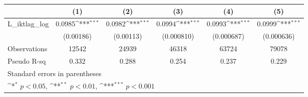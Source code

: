 {
\def\sym#1{\ifmmode^{#1}\else\(^{#1}\)\fi}
\begin{tabular}{l*{5}{c}}
\hline\hline
                &\multicolumn{1}{c}{(1)}         &\multicolumn{1}{c}{(2)}         &\multicolumn{1}{c}{(3)}         &\multicolumn{1}{c}{(4)}         &\multicolumn{1}{c}{(5)}         \\
\hline
L\_iktlag\_log    &   0.0985\sym{***}&   0.0982\sym{***}&   0.0994\sym{***}&   0.0993\sym{***}&   0.0999\sym{***}\\
                &(0.00186)         &(0.00113)         &(0.000810)         &(0.000687)         &(0.000636)         \\
\hline
Observations    &    12542         &    24939         &    46318         &    63724         &    79078         \\
Pseudo R-sq     &    0.332         &    0.288         &    0.254         &    0.237         &    0.229         \\
\hline\hline
\multicolumn{6}{l}{\footnotesize Standard errors in parentheses}\\
\multicolumn{6}{l}{\footnotesize \sym{*} \(p<0.05\), \sym{**} \(p<0.01\), \sym{***} \(p<0.001\)}\\
\end{tabular}
}
